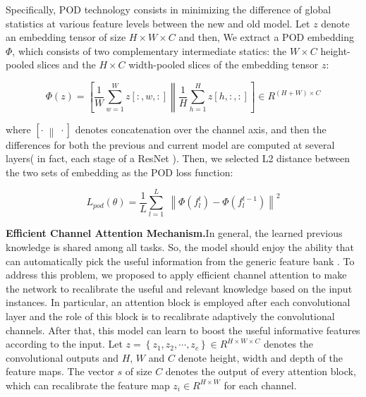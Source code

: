 \documentclass[review]{elsarticle}
\begin{document}
Specifically, POD technology consists in minimizing the difference of global statistics at various feature levels between the new and old model. Let $z$ denote an embedding tensor of size $H \times W \times C$ and then, We extract a POD embedding $\Phi $, which consists of two complementary intermediate statics: the  $W \times C$ height-pooled slices and the $H \times C$ width-pooled slices of the embedding tensor $z$:

\begin{equation}
\Phi \left( z \right) = \left[ {\frac{1}{W}\sum\limits_{w = 1}^W {z\left[ {:,w,:} \right]\left\| {\frac{1}{H}\sum\limits_{h = 1}^H {z\left[ {h,:,:} \right]} } \right.} } \right] \in {R^{\left( {H + W} \right) \times C}}
\end{equation}

where $\left[ { \cdot \;\left\| {\; \cdot } \right.} \right]$ denotes concatenation over the channel axis, and then the differences for both the previous and current model are computed at several layers( in fact, each stage of a ResNet \cite{16he2016deep}). Then, we selected L2 distance between the two sets of embedding as the POD loss function:

\begin{equation}
{L_{pod}}\left( \theta  \right) = \frac{1}{L}\sum\limits_{l = 1}^L {\;{{\left\| {\Phi \left( {f_l^t} \right) - \Phi \left( {f_l^{t - 1}} \right)} \right\|}^2}} 
\end{equation}

\textbf{Efficient Channel Attention Mechanism.}In general, the learned previous knowledge is shared among all tasks. So, the model should enjoy the ability that can automatically pick the useful information from the generic feature bank \cite{17sokar2021self}. To address this problem, we proposed to apply efficient channel attention \cite{18wang2020eca} to make the network to recalibrate the useful and relevant knowledge based on the input instances. In particular, an attention block is employed after each convolutional layer and the role of this block is to recalibrate adaptively the convolutional channels. After that, this model can learn to boost the useful informative features according to the input. Let $z = \left\{ {{z_1},{z_2}, \cdots ,{z_c}} \right\} \in {R^{H \times W \times C}}$ denotes the convolutional outputs and $H$, $W$ and $C$ denote height, width and depth of the feature maps. The vector $s$ of size $C$ denotes the output of every attention block, which can recalibrate the feature map ${z_i} \in {R^{H \times W}}$  for each channel.
\end{document}
